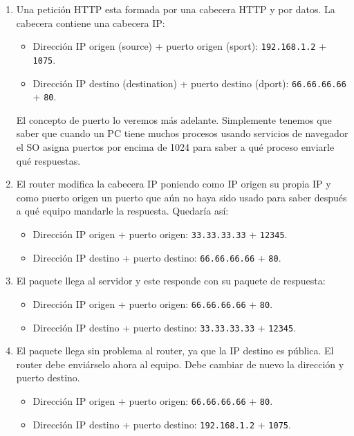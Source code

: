\begin{enumerate}[label=(\arabic*)]
    \item Una petición \acrshort{HTTP} esta formada por una cabecera HTTP y por datos. La cabecera contiene una cabecera IP:
        \begin{itemize}
            \item Dirección IP origen (source) + puerto origen (sport): \verb|192.168.1.2| + \verb|1075|.
            \item Dirección IP destino (destination) + puerto destino (dport): \verb|66.66.66.66| + \verb|80|.
        \end{itemize}
    El concepto de puerto lo veremos más adelante. Simplemente tenemos que saber que cuando un PC tiene muchos procesos usando servicios de navegador el SO asigna puertos por encima de 1024 para saber a qué proceso enviarle qué respuestas.
    \item El router modifica la cabecera IP poniendo como IP origen su propia IP y como puerto origen un puerto que aún no haya sido usado para saber después a qué equipo mandarle la respuesta. Quedaría así:
        \begin{itemize}
            \item Dirección IP origen + puerto origen: \verb|33.33.33.33| + \verb|12345|.
            \item Dirección IP destino + puerto destino: \verb|66.66.66.66| + \verb|80|.
        \end{itemize}
    
    \item El paquete llega al servidor y este responde con su paquete de respuesta:
        \begin{itemize}
            \item Dirección IP origen + puerto origen: \verb|66.66.66.66| + \verb|80|.
            \item Dirección IP destino + puerto destino: \verb|33.33.33.33| + \verb|12345|.
        \end{itemize}
    
    \item El paquete llega sin problema al router, ya que la IP destino es pública. El router debe enviárselo ahora al equipo. Debe cambiar de nuevo la dirección y puerto destino. 
        \begin{itemize}
            \item Dirección IP origen + puerto origen: \verb|66.66.66.66| + \verb|80|.
            \item Dirección IP destino + puerto destino: \verb|192.168.1.2| + \verb|1075|.
        \end{itemize}
\end{enumerate}

